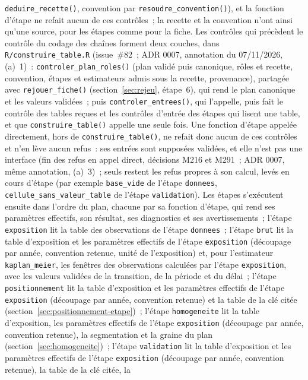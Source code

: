 \documentclass[a4paper,11pt]{article}
\newcommand{\code}[1]{\texttt{\small #1}}
\begin{document}
{\code{deduire\_recette()}, convention par \code{resoudre\_convention()}),
et la fonction d'étape ne refait aucun de ces contrôles~; la recette et la
convention n'ont ainsi qu'une source, pour les étapes comme pour la fiche.
Les contrôles qui précèdent le contrôle du codage des chaînes forment deux
couches, dans \code{R/construire\_table.R} (issue~\#82~; ADR 0007,
annotation du 07/11/2026, (a)~1)~: \code{controler\_plan\_roles()} (plan
validé puis canonique, rôles et recette, convention, étapes et estimateurs
admis sous la recette, provenance), partagée
avec \code{rejouer\_fiche()} (section~\ref{sec:rejeu}, étape~6), qui rend le
plan canonique et les valeurs validées~; puis \code{controler\_entrees()},
qui l'appelle, puis fait le contrôle des tables reçues et les contrôles
d'entrée des étapes qui lisent une table, et que \code{construire\_table()}
appelle une seule fois. Une fonction d'étape appelée directement, hors de
\code{construire\_table()}, ne refait donc aucun de ces contrôles et n'en
lève aucun refus~: ses entrées sont supposées validées, et elle n'est pas
une interface (fin des refus en appel direct, décisions M216 et M291~; ADR
0007, même annotation, (a)~3)~; seuls restent les refus propres à son
calcul, levés en cours d'étape (par exemple \code{base\_vide} de l'étape
\code{donnees}, \code{cellule\_sans\_valeur\_table} de l'étape
\code{validation}). Les étapes s'exécutent ensuite dans l'ordre du plan,
chacune par sa fonction d'étape, qui rend ses paramètres effectifs, son
résultat, ses diagnostics et ses avertissements~; l'étape \code{exposition}
lit la table des observations de l'étape \code{donnees}~; l'étape \code{brut}
lit la table d'exposition et les paramètres effectifs de l'étape
\code{exposition} (découpage par année, convention retenue, unité de
l'exposition) et, pour l'estimateur \code{kaplan\_meier}, les fenêtres des
observations calculées par l'étape \code{exposition}, avec les valeurs
validées de la transition, de la période et du délai~; l'étape
\code{positionnement} lit la table d'exposition et les paramètres effectifs
de l'étape \code{exposition} (découpage par année, convention retenue) et
la table de la clé citée (section~\ref{sec:positionnement-etape})~; l'étape
\code{homogeneite} lit la table d'exposition, les paramètres effectifs de
l'étape \code{exposition} (découpage par année, convention retenue), la
segmentation et la graine du plan (section~\ref{sec:homogeneite})~; l'étape
\code{validation} lit la table
d'exposition et les paramètres effectifs de l'étape \code{exposition}
(découpage par année, convention retenue), la table de la clé citée, la
}
\end{document}
